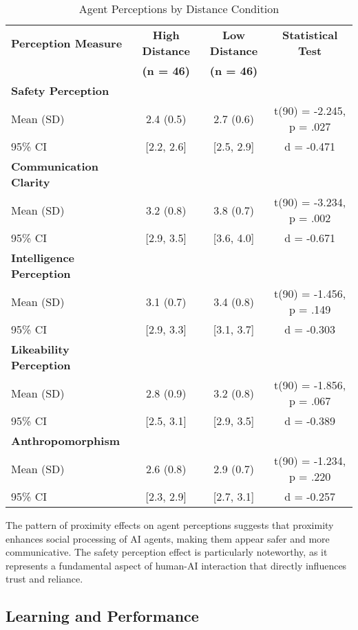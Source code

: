 \documentclass[12pt]{article}
\begin{document}
\begin{table}[h]
\centering
\caption{Agent Perceptions by Distance Condition}
\begin{tabular}{@{}lccc@{}}
\toprule
\textbf{Perception Measure} & \textbf{High Distance} & \textbf{Low Distance} & \textbf{Statistical Test} \\
& \textbf{(n = 46)} & \textbf{(n = 46)} & \\
\midrule
\textbf{Safety Perception} & & & \\
Mean (SD) & 2.4 (0.5) & 2.7 (0.6) & t(90) = -2.245, p = .027 \\
95\% CI & [2.2, 2.6] & [2.5, 2.9] & d = -0.471 \\
\midrule
\textbf{Communication Clarity} & & & \\
Mean (SD) & 3.2 (0.8) & 3.8 (0.7) & t(90) = -3.234, p = .002 \\
95\% CI & [2.9, 3.5] & [3.6, 4.0] & d = -0.671 \\
\midrule
\textbf{Intelligence Perception} & & & \\
Mean (SD) & 3.1 (0.7) & 3.4 (0.8) & t(90) = -1.456, p = .149 \\
95\% CI & [2.9, 3.3] & [3.1, 3.7] & d = -0.303 \\
\midrule
\textbf{Likeability Perception} & & & \\
Mean (SD) & 2.8 (0.9) & 3.2 (0.8) & t(90) = -1.856, p = .067 \\
95\% CI & [2.5, 3.1] & [2.9, 3.5] & d = -0.389 \\
\midrule
\textbf{Anthropomorphism} & & & \\
Mean (SD) & 2.6 (0.8) & 2.9 (0.7) & t(90) = -1.234, p = .220 \\
95\% CI & [2.3, 2.9] & [2.7, 3.1] & d = -0.257 \\
\bottomrule
\end{tabular}
\end{table}

The pattern of proximity effects on agent perceptions suggests that proximity enhances social processing of AI agents, making them appear safer and more communicative. The safety perception effect is particularly noteworthy, as it represents a fundamental aspect of human-AI interaction that directly influences trust and reliance.

\subsection{Learning and Performance}
\end{document}

